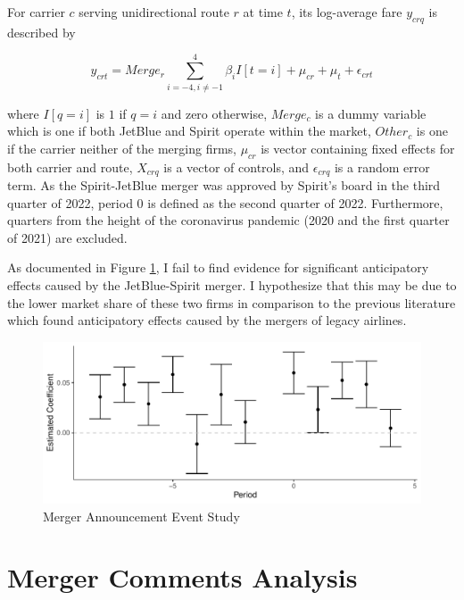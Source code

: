 \documentclass{article}
\begin{document}
\begin{appendices}
    For carrier $c$ serving unidirectional route $r$ at time $t$, its log-average fare $y_{crq}$ is described by 

    \[y_{crt} = Merge_{r} \sum_{i = - 4, i \neq -1}^{4} \beta_{i}I[t = i]  + \mu_{cr} + \mu_{t} + \epsilon_{crt}\]

    where $I[q = i]$ is $1$ if $q = i$ and zero otherwise, $Merge_{c}$ is a dummy variable which is one if both JetBlue and Spirit operate within the market, $Other_c$ is one if the carrier neither of the merging firms, $\mu_{cr}$ is vector containing fixed effects for both carrier and route, $X_{crq}$ is a vector of controls, and $\epsilon_{crq}$ is a random error term. As the Spirit-JetBlue merger was approved by Spirit's board in the third quarter of 2022, period $0$ is defined as the second quarter of 2022. Furthermore, quarters from the height of the coronavirus pandemic (2020 and the first quarter of 2021) are excluded. 

    As documented in Figure \ref{fig:MergerAnnouncement_Plot}, I fail to find evidence for significant anticipatory effects caused by the JetBlue-Spirit merger. I hypothesize that this may be due to the lower market share of these two firms in comparison to the previous literature which found anticipatory effects caused by the mergers of legacy airlines. 

    \begin{figure}
    \caption{Merger Announcement Event Study}
    \label{fig:MergerAnnouncement_Plot}
    \includegraphics[width = \linewidth]{05.Figures/Merger_Anticipate_Figure.pdf}
    \end{figure}

    \FloatBarrier
	\section{Merger Comments Analysis}
    \label{sec:NaturalLanguage}

    \setcounter{table}{0}
    \setcounter{figure}{0}



\end{appendices}
\end{document}
